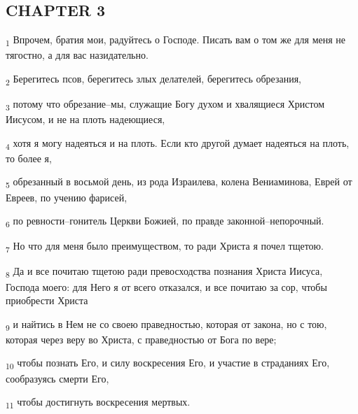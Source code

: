 \subsection{CHAPTER 3}
\begin{tcolorbox}
\textsubscript{1} Впрочем, братия мои, радуйтесь о Господе. Писать вам о том же для меня не тягостно, а для вас назидательно.
\end{tcolorbox}
\begin{tcolorbox}
\textsubscript{2} Берегитесь псов, берегитесь злых делателей, берегитесь обрезания,
\end{tcolorbox}
\begin{tcolorbox}
\textsubscript{3} потому что обрезание--мы, служащие Богу духом и хвалящиеся Христом Иисусом, и не на плоть надеющиеся,
\end{tcolorbox}
\begin{tcolorbox}
\textsubscript{4} хотя я могу надеяться и на плоть. Если кто другой думает надеяться на плоть, то более я,
\end{tcolorbox}
\begin{tcolorbox}
\textsubscript{5} обрезанный в восьмой день, из рода Израилева, колена Вениаминова, Еврей от Евреев, по учению фарисей,
\end{tcolorbox}
\begin{tcolorbox}
\textsubscript{6} по ревности--гонитель Церкви Божией, по правде законной--непорочный.
\end{tcolorbox}
\begin{tcolorbox}
\textsubscript{7} Но что для меня было преимуществом, то ради Христа я почел тщетою.
\end{tcolorbox}
\begin{tcolorbox}
\textsubscript{8} Да и все почитаю тщетою ради превосходства познания Христа Иисуса, Господа моего: для Него я от всего отказался, и все почитаю за сор, чтобы приобрести Христа
\end{tcolorbox}
\begin{tcolorbox}
\textsubscript{9} и найтись в Нем не со своею праведностью, которая от закона, но с тою, которая через веру во Христа, с праведностью от Бога по вере;
\end{tcolorbox}
\begin{tcolorbox}
\textsubscript{10} чтобы познать Его, и силу воскресения Его, и участие в страданиях Его, сообразуясь смерти Его,
\end{tcolorbox}
\begin{tcolorbox}
\textsubscript{11} чтобы достигнуть воскресения мертвых.
\end{tcolorbox}
